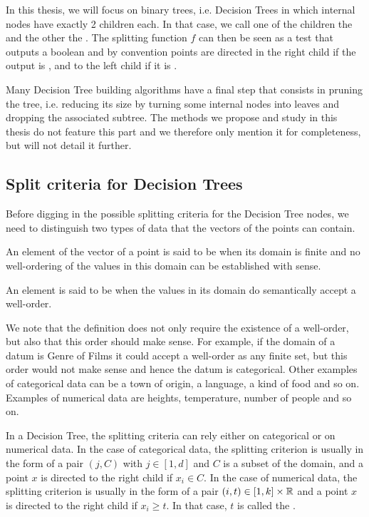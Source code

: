 In this thesis, we will focus on binary trees, i.e. Decision Trees in which internal nodes have exactly 2 children each. In that case, we call one of the children the  and the other the . The splitting function $f$ can then be seen as a test that outputs a boolean and by convention points are directed in the right child if the output is \codetrue, and to the left child if it is \codefalse.

Many Decision Tree building algorithms have a final step that consists in pruning the tree, i.e. reducing its size by turning some internal nodes into leaves and dropping the associated subtree. The methods we propose and study in this thesis do not feature this part and we therefore only mention it for completeness, but will not detail it further.

\subsection{Split criteria for Decision Trees} \label{subsec:intro_dt_split_criteria}
Before digging in the possible splitting criteria for the Decision Tree nodes, we need to distinguish two types of data that the vectors of the points can contain.
\begin{definition}
    An element of the vector of a point is said to be  when its domain is finite and no well-ordering of the values in this domain can be established with sense.

    An element is said to be  when the values in its domain do semantically accept a well-order.
\end{definition}

We note that the definition does not only require the existence of a well-order, but also that this order should make sense. For example, if the domain of a datum is Genre of Films it could accept a well-order as any finite set, but this order would not make sense and hence the datum is categorical. Other examples of categorical data can be a town of origin, a language, a kind of food and so on. Examples of numerical data are heights, temperature, number of people and so on.

In a Decision Tree, the splitting criteria can rely either on categorical or on numerical data. In the case of categorical data, the splitting criterion is usually in the form of a pair $(j, C)$ with $j\in [1, d]$ and $C$ is a subset of the domain, and a point $x$ is directed to the right child if $x_i \in C$. In the case of numerical data, the splitting criterion is usually in the form of a pair $(i, t) \in [1, k]\times \mathbb{R}$ and a point $x$ is directed to the right child if $x_i \geq t$. In that case, $t$ is called the .

